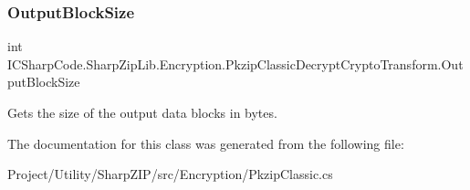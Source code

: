 \subsubsection{\texorpdfstring{Output\+Block\+Size}{OutputBlockSize}}
{\footnotesize\ttfamily int I\+C\+Sharp\+Code.\+Sharp\+Zip\+Lib.\+Encryption.\+Pkzip\+Classic\+Decrypt\+Crypto\+Transform.\+Output\+Block\+Size\hspace{0.3cm}{\ttfamily [get]}}



Gets the size of the output data blocks in bytes. 



The documentation for this class was generated from the following file\+:\begin{DoxyCompactItemize}
\item 
Project/\+Utility/\+Sharp\+Z\+I\+P/src/\+Encryption/Pkzip\+Classic.\+cs\end{DoxyCompactItemize}
